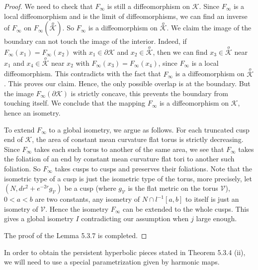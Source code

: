 \begin{proof}
We need to check that $F_{\infty}$ is still a diffeomorphism on
$\mathcal{K}$. Since $F_{\infty}$ is a local diffeomorphism and is
the limit of diffeomorphisms, we can find an inverse of
$F_{\infty}$ on $F_{\infty}(\overset{o}{\mathcal{K}})$. So
$F_{\infty}$ is a diffeomorphism on $\overset{o}{\mathcal{K}}$. We
claim the image of the boundary can not touch the image of the
interior. Indeed, if $F_{\infty}(x_{1})=F_{\infty}(x_{2})$ with
$x_{1}\in \partial \mathcal{K} $ and $x_{2}\in
\overset{o}{\mathcal{K}} $, then we can find $x_{3}\in
\overset{o}{\mathcal{K}}$ near $x_{1}$ and $x_{4}\in
\overset{o}{\mathcal{K}}$ near $x_{2}$ with
$F_{\infty}(x_{3})=F_{\infty}(x_{4})$, since $F_{\infty}$ is a
local diffeomorphism. This contradicts with the fact that
$F_{\infty}$ is a diffeomorphism on $\overset{o}{\mathcal{K}}$.
This proves our claim. Hence, the only possible overlap is at the
boundary. But the image $F_{\infty}(\partial \mathcal{K})$ is
strictly concave, this prevents the boundary from touching itself.
We conclude that the mapping $F_{\infty}$ is a diffeomorphism on
$\mathcal{K}$, hence an isometry.

To extend $F_{\infty}$ to a global isometry, we argue as follows.
For each truncated cusp end of $\mathcal{K}$,  the area of
constant mean curvature flat torus is strictly decreasing. Since
$F_{\infty}$ takes each such torus to another of the same area, we
see that $F_{\infty}$ takes the foliation of an end by constant
mean curvature flat tori to another such foliation. So
$F_{\infty}$ takes cusps to cusps and preserves their foliations.
Note that the isometric type of a cusp is just the isometric type
of the torus, more precisely, let
$(N,dr^{2}+e^{-2r}g_{\mathcal{V}})$ be a cusp (where
$g_{\mathcal{V}}$ is the flat metric on the torus $\mathcal{V}$),
$0<a<b$ are two constants, any isometry of $N\cap l^{-1}[a,b]$ to
itself is just an isometry of $\mathcal{V}$. Hence the isometry
$F_{\infty}$ can be extended to the whole cusps. This gives a
global isometry $I$ contradicting our assumption when $j$ large
enough.

The proof of the Lemma 5.3.7 is completed.
\end{proof}

In order to obtain the persistent hyperbolic pieces stated in
Theorem 5.3.4 (ii), we will need to use a special parametrization
given by harmonic maps.


